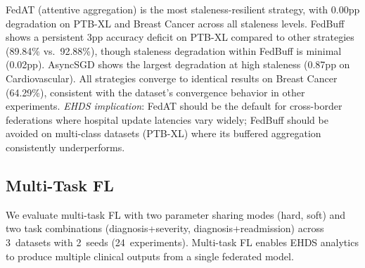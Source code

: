 \documentclass[conference,a4paper]{IEEEtran}
\begin{document}
\begin{table}[htbp]
\centering
\caption{Asynchronous FL: Accuracy (\%) by Strategy and Staleness}
\label{tab:async_fl}

\vspace{1mm}
\footnotesize{FedAT (attentive aggregation) is the most staleness-resilient strategy, with 0.00pp degradation on PTB-XL and Breast Cancer across all staleness levels. FedBuff shows a persistent 3pp accuracy deficit on PTB-XL compared to other strategies (89.84\% vs.\ 92.88\%), though staleness degradation within FedBuff is minimal (0.02pp). AsyncSGD shows the largest degradation at high staleness (0.87pp on Cardiovascular). All strategies converge to identical results on Breast Cancer (64.29\%), consistent with the dataset's convergence behavior in other experiments. \textit{EHDS implication}: FedAT should be the default for cross-border federations where hospital update latencies vary widely; FedBuff should be avoided on multi-class datasets (PTB-XL) where its buffered aggregation consistently underperforms.}
\end{table}

\subsection{Multi-Task FL}
\label{sec:multitask_fl}

We evaluate multi-task FL with two parameter sharing modes (hard, soft) and two task combinations (diagnosis+severity, diagnosis+readmission) across 3~datasets with 2~seeds (24~experiments). Multi-task FL enables EHDS analytics to produce multiple clinical outputs from a single federated model.
\end{document}
